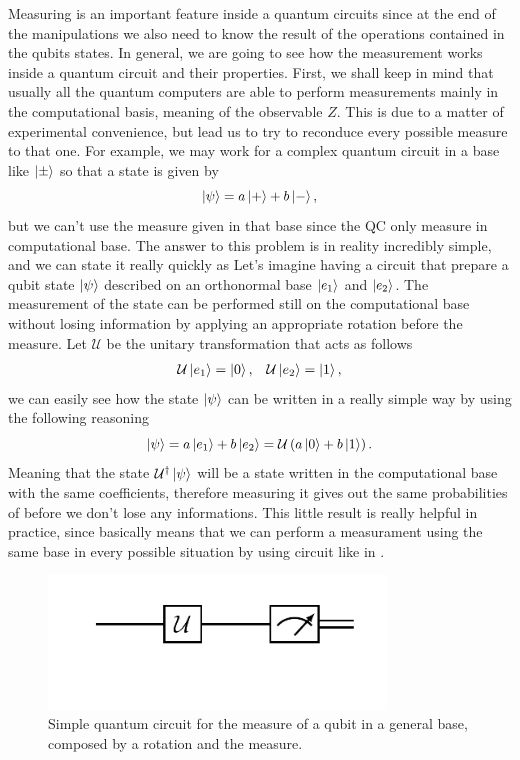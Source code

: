 Measuring is an important feature inside a quantum circuits since at the end of the manipulations we also need to know the result of the operations contained in the qubits states. In general, we are going to see how the measurement works inside a quantum circuit and their properties. First, we shall keep in mind that usually all the quantum computers are able to perform measurements mainly in the computational basis, meaning of the observable $Z$. This is due to a matter of experimental convenience, but lead us to try to reconduce every possible measure to that one. For example, we may work for a complex quantum circuit in a base like $\ket{\pm}$ so that a state is given by
\begin{equation}
    \ket{\psi} = a\ket{+} + b\ket{-},
\end{equation}
but we can't use the measure given in that base since the QC only measure in computational base. The answer to this problem is in reality incredibly simple, and we can state it really quickly as
{
    Let's imagine having a circuit that prepare a qubit state $\ket{\psi}$ described on an orthonormal base $\ket{e_1}$ and $\ket{e_2}$. The measurement of the state can be performed still on the computational base without losing information by applying an appropriate rotation before the measure.
}
{
    Let $\mathcal{U}$ be the unitary transformation that acts as follows
    \begin{align}
        &\mathcal{U}\ket{e_1} = \ket{0}, &\mathcal{U}\ket{e_2} = \ket{1},
    \end{align}
    we can easily see how the state $\ket{\psi}$ can be written in a really simple way by using the following reasoning
    \begin{equation}
        \ket{\psi} = a\ket{e_1} + b\ket{e_2} = \mathcal{U}\left( a\ket{0} + b\ket{1} \right).
    \end{equation}
    Meaning that the state $\mathcal{U}^\dagger\ket{\psi}$ will be a state written in the computational base with the same coefficients, therefore measuring it gives out the same probabilities of before we don't lose any informations.
}
\noindent
This little result is really helpful in practice, since basically means that we can perform a measurament using the same base in every possible situation by using circuit like in .
\begin{figure}[b]
    \centering
    \includegraphics[width=0.8\textwidth]{Immagini/Measure.pdf}
    \caption{Simple quantum circuit for the measure of a qubit in a general base, composed by a rotation and the measure.}
    \label{fig:Measure}
\end{figure}

